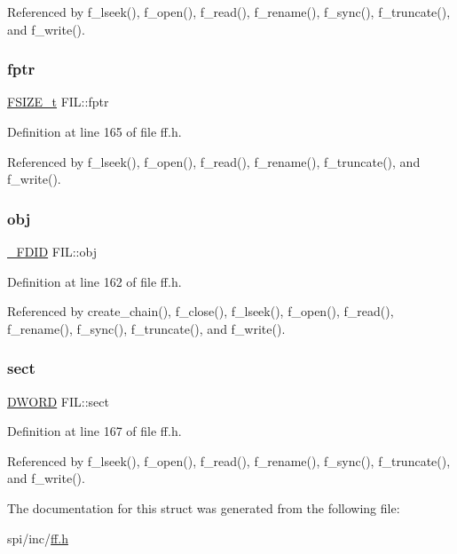 Referenced by f\+\_\+lseek(), f\+\_\+open(), f\+\_\+read(), f\+\_\+rename(), f\+\_\+sync(), f\+\_\+truncate(), and f\+\_\+write().

\mbox{\label{structFIL_a088b03ab2e02f82e10e17bdd938190a6}} 
\subsubsection{\texorpdfstring{fptr}{fptr}}
{\footnotesize\ttfamily \hyperlink{ff_8h_a3fc0992ad7436250b6b1a0592214b7f2}{F\+S\+I\+Z\+E\+\_\+t} F\+I\+L\+::fptr}



Definition at line 165 of file ff.\+h.



Referenced by f\+\_\+lseek(), f\+\_\+open(), f\+\_\+read(), f\+\_\+rename(), f\+\_\+truncate(), and f\+\_\+write().

\mbox{\label{structFIL_ae7242545ea88ea2602484122ebe65fa3}} 
\subsubsection{\texorpdfstring{obj}{obj}}
{\footnotesize\ttfamily \hyperlink{struct__FDID}{\+\_\+\+F\+D\+ID} F\+I\+L\+::obj}



Definition at line 162 of file ff.\+h.



Referenced by create\+\_\+chain(), f\+\_\+close(), f\+\_\+lseek(), f\+\_\+open(), f\+\_\+read(), f\+\_\+rename(), f\+\_\+sync(), f\+\_\+truncate(), and f\+\_\+write().

\mbox{\label{structFIL_affec18b48fe716fdae6a60123fc61145}} 
\subsubsection{\texorpdfstring{sect}{sect}}
{\footnotesize\ttfamily \hyperlink{integer_8h_ad342ac907eb044443153a22f964bf0af}{D\+W\+O\+RD} F\+I\+L\+::sect}



Definition at line 167 of file ff.\+h.



Referenced by f\+\_\+lseek(), f\+\_\+open(), f\+\_\+read(), f\+\_\+rename(), f\+\_\+sync(), f\+\_\+truncate(), and f\+\_\+write().



The documentation for this struct was generated from the following file\+:\begin{DoxyCompactItemize}
\item 
spi/inc/\hyperlink{ff_8h}{ff.\+h}\end{DoxyCompactItemize}
